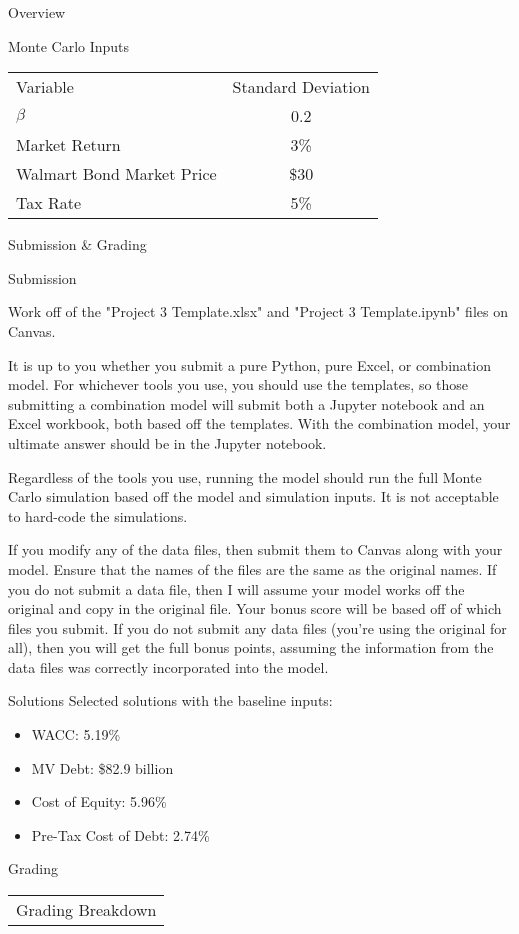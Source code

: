 \documentclass[]{article}
\begin{document}
\begin{section}{Overview}
\begin{subsection}{Monte Carlo Inputs}
\begin{center}
\begin{tabular}{l|c}
\toprule
Variable & Standard Deviation\\

\cmidrule(lr){1-2}
$\beta$ & 0.2\\
Market Return & 3\%\\
Walmart Bond Market Price & \$30\\
Tax Rate & 5\%\\

\bottomrule
\end{tabular}
\end{center}
\label{mc-inputs}
\end{subsection}
\end{section}
\begin{section}{Submission \& Grading}
\begin{subsection}{Submission}

Work off of the "Project 3 Template.xlsx" and "Project 3 Template.ipynb" files on Canvas.

It is up to you whether you submit a pure Python, pure Excel, or combination model. For whichever tools
you use, you should use the templates, so those submitting a combination model will submit both a Jupyter notebook
and an Excel workbook, both based off the templates. With the combination model, your ultimate answer should be
in the Jupyter notebook.

Regardless of the tools you use, running the model should run the full Monte Carlo simulation based off the
model and simulation inputs. It is not acceptable to hard-code the simulations.

If you modify any of the data files, then submit them to Canvas along with your model. Ensure that the names of
the files are the same as the original names. If you do not submit a data file, then I will assume your model
works off the original and copy in the original file. Your bonus score will be based off of which files you submit.
If you do not submit any data files (you're using the original for all), then you will get the full bonus points,
assuming the information from the data files was correctly incorporated into the model.

\end{subsection}
\begin{subsection}{Solutions}
Selected solutions with the baseline inputs:
\begin{itemize}
\item WACC: 5.19\%
\item MV Debt: \$82.9 billion
\item Cost of Equity: 5.96\%
\item Pre-Tax Cost of Debt: 2.74\%
\end{itemize}
\end{subsection}
\begin{subsection}{Grading}
\begin{center}
\begin{tabular}{l|c}
\multicolumn{2}{c}{Grading Breakdown}\\


\end{tabular}
\end{center}
\end{subsection}
\end{section}
\end{document}
